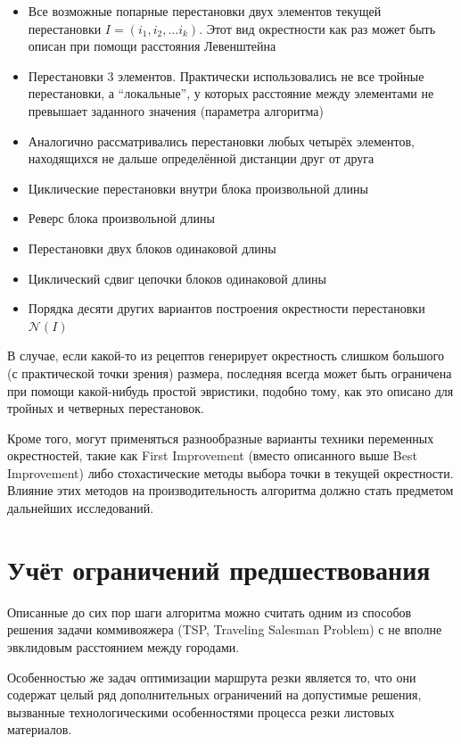\documentclass{article}
\begin{document}
\begin{itemize}
    \item Все возможные попарные перестановки двух элементов текущей перестановки $I=(i_1, i_2, \dots i_k)$.
    Этот вид окрестности как раз может быть описан при помощи расстояния Левенштейна
    \item Перестановки 3 элементов.
    Практически использовались не все тройные перестановки,
    а ``локальные'',
    у которых расстояние между элементами не превышает
    заданного значения
    (параметра алгоритма)
    \item Аналогично рассматривались перестановки любых
    четырёх элементов,
    находящихся не дальше определённой дистанции
    друг от друга
    \item Циклические перестановки внутри блока произвольной длины
    \item Реверс блока произвольной длины
    \item Перестановки двух блоков одинаковой длины
    \item Циклический сдвиг цепочки блоков одинаковой длины
    \item Порядка десяти других вариантов построения окрестности перестановки $\mathcal N(I)$
\end{itemize}

В случае,
если какой-то из рецептов генерирует
окрестность слишком большого 
(с практической точки зрения)
размера,
последняя всегда может быть
ограничена при помощи какой-нибудь простой эвристики,
подобно тому,
как это описано для 
тройных и четверных перестановок.

Кроме того,
могут применяться разнообразные варианты
техники переменных окрестностей,
такие как
First Improvement
(вместо описанного выше Best Improvement)
либо стохастические методы выбора
точки в текущей окрестности.
Влияние этих методов
на производительность алгоритма
должно стать предметом дальнейших исследований.

\section{Учёт ограничений предшествования}

Описанные до сих пор шаги алгоритма 
можно считать одним из способов решения
задачи коммивояжера
(TSP, Traveling Salesman Problem)
с не вполне эвклидовым расстоянием
между городами.

Особенностью же задач оптимизации
маршрута резки является то,
что они содержат целый ряд дополнительных
ограничений на допустимые решения,
вызванные технологическими особенностями
процесса резки листовых материалов.
\end{document}
